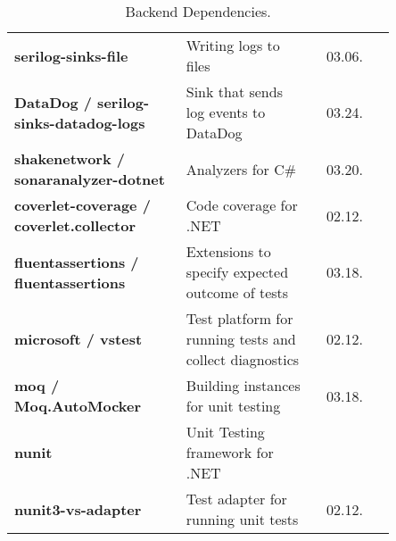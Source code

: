 \begin{table}[h!]
{\begin{tabular}{ p{0.45\linewidth} p{0.35\linewidth} r p{0.05\linewidth} }
          \addlinespace
          
          \textbf{serilog-sinks-file} & Writing logs to files & 03.06. \\
          
          \addlinespace[0.2cm]
          \midrule
          \addlinespace[0.2cm]
          
          \textbf{DataDog / serilog-sinks-datadog-logs} & Sink that sends log events to DataDog & 03.24. \\
          
          \addlinespace[0.2cm]
          \midrule
          \addlinespace[0.2cm]
          
          \textbf{shakenetwork / sonaranalyzer-dotnet} & Analyzers for C\# & 03.20. \\
          
          \addlinespace[0.2cm]
          \midrule
          \addlinespace[0.2cm]
          
          \textbf{coverlet-coverage / coverlet.collector} & Code coverage for .NET & 02.12. \\
          
          \addlinespace[0.2cm]
          \midrule
          \addlinespace[0.2cm]
          
          \textbf{fluentassertions / fluentassertions} & Extensions to specify expected outcome of tests & 03.18. \\
          
          \addlinespace[0.2cm]
          \midrule
          \addlinespace[0.2cm]
          
          \textbf{microsoft / vstest} & Test platform for running tests and collect diagnostics & 02.12. \\
          
          \addlinespace[0.2cm]
          \midrule
          \addlinespace[0.2cm]
          
          \textbf{moq / Moq.AutoMocker} & Building instances for unit testing & 03.18. \\
          
          \addlinespace[0.2cm]
          \midrule
          \addlinespace[0.2cm]
          
          \textbf{nunit} & Unit Testing framework for .NET \\
          
          \addlinespace[0.2cm]
          
          \textbf{nunit3-vs-adapter} & Test adapter for running unit tests & 02.12. \\
          
          \bottomrule
        \end{tabular}
    }
    
    \caption{Backend Dependencies.}
    \label{fig:backendDependencyTable}
\end{table}


